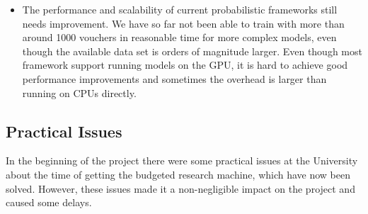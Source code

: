 \documentclass[12pt,a4paper]{article}
\begin{document}
\begin{itemize}
  still have limitations for more complex models. During the project, I had to
  debug\,\footnote{See ``Getting auto-enumeration working with transformed
    distributions'' (\url{https://forum.pyro.ai/t/getting-auto-enumeration-working-with-transformed-distributions/440a}),
``NaN occured in optimization'' (\url{https://discourse.pymc.io/t/nan-occured-in-optimization-in-a-vonmises-mixture-model/1296}),
``[bug] --jit option fails for HMM example''
(\url{https://github.com/uber/pyro/issues/1435}),
``pm.sample\_prior\_predictive
fails when model contains a mixture-based distribution''
(\url{https://github.com/pymc-devs/pymc3/issues/3101}), and ``Updated mixture model breaks with multi-dimension mixtures''
(\url{https://github.com/pymc-devs/pymc3/issues/3044})
}
and profile\,\footnote{See ``Profiling TraceEnumELBO''
  (\url{https://forum.pyro.ai/t/invalid-index-in-gather-for-model-relying-on-auto-enumeration/479/5})} the frameworks themselves to identify bugs and limitations,
  discuss the issues with the framework developers and contribute
  code\,\footnote{See ``Working on component-wise transformations that mimic
    torch.cat and torch.stack''
    (\url{https://github.com/pytorch/pytorch/pull/11868}), ``Add documentation
    for transform functions''
    (\url{https://github.com/pymc-devs/pymc3/pull/3192}), ``Add site information
    for possible exception thrown when calculating logp''
    (\url{https://github.com/uber/pyro/pull/1509}) and ``Clarify phrasing of
    installation instructions with regards to running examples'' (\url{https://github.com/uber/pyro/pull/1533})} to fix
  some of these issues.
\item The performance and scalability of current probabilistic frameworks still
  needs improvement. We have so far not been able to train with more than around 1000
  vouchers in reasonable time for more complex models, even though the available
  data set is orders of magnitude larger. Even though most framework support
  running models on the GPU, it is hard to achieve good performance improvements
  and sometimes the overhead is larger than running on CPUs directly.
\end{itemize}

\subsection{Practical Issues}
In the beginning of the project there were some practical issues at the
University about the time of getting the budgeted research machine, which have now been solved. However, these issues made it a
non-negligible impact on the project and caused some delays.
\end{document}
